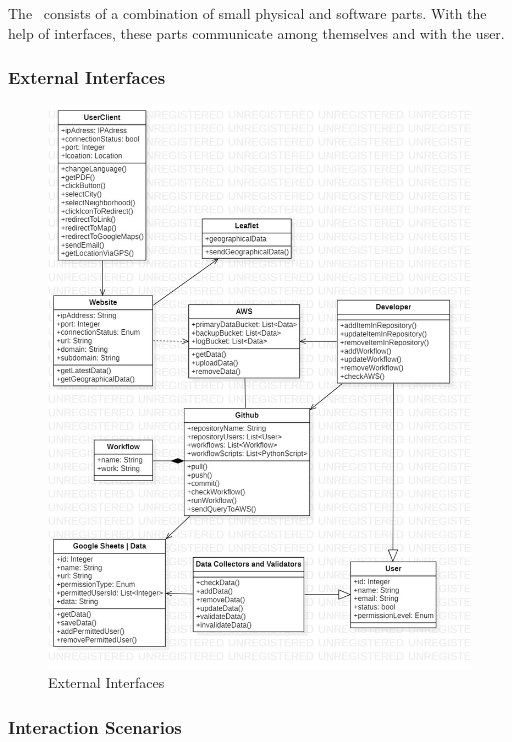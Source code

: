 The \afetbilgi\ consists of a combination of small physical and software parts. With the help of interfaces, these parts communicate among themselves and with the user.

\subsubsection{External Interfaces}

\begin{figure}[H]
  \centering
  \includegraphics[width=\linewidth]{img/external-interfaces-diagram.jpg}
  \caption{External Interfaces}
\end{figure}

\subsubsection{Interaction Scenarios}

